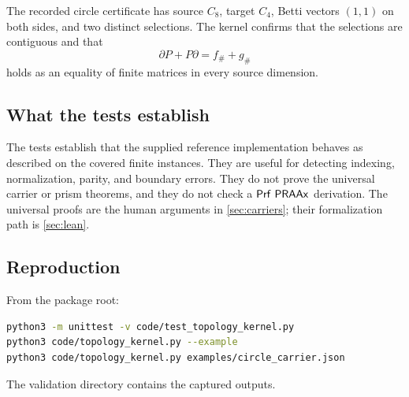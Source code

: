 The recorded circle certificate has source $C_8$, target $C_4$, Betti vectors $(1,1)$ on both sides, and two distinct selections.  The kernel confirms that the selections are contiguous and that
\[
  \partial P+P\partial=f_\#+g_\#
\]
holds as an equality of finite matrices in every source dimension.

\subsection{What the tests establish}

The tests establish that the supplied reference implementation behaves as described on the covered finite instances.  They are useful for detecting indexing, normalization, parity, and boundary errors.  They do not prove the universal carrier or prism theorems, and they do not check a $\mathsf{Prf}\ \mathsf{PRAAx}$ derivation.  The universal proofs are the human arguments in \cref{sec:carriers}; their formalization path is \cref{sec:lean}.

\subsection{Reproduction}

From the package root:
\begin{lstlisting}[language=bash]
python3 -m unittest -v code/test_topology_kernel.py
python3 code/topology_kernel.py --example
python3 code/topology_kernel.py examples/circle_carrier.json
\end{lstlisting}
The validation directory contains the captured outputs.
